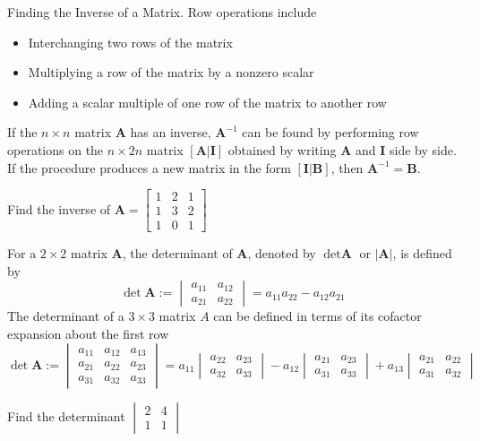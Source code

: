 \documentclass[../diffeq.tex]{subfiles}
\begin{document}
Finding the Inverse of a Matrix. Row operations include 
\begin{itemize}
    \item Interchanging two rows of the matrix 
    \item Multiplying a row of the matrix by a nonzero scalar
    \item Adding a scalar multiple of one row of the matrix to another row 
\end{itemize}
If the $n\times n$ matrix $\textbf{A}$ has an inverse, $\textbf{A}^{-1}$ can be found by performing row operations on the $n\times 2n$ matrix $[\textbf{A}|\textbf{I}]$ obtained by writing 
$\textbf{A}$ and $\textbf{I}$ side by side. If the procedure produces a new matrix in the form $[\textbf{I}|\textbf{B}]$, then $\textbf{A}^{-1}=\textbf{B}$.

\ex Find the inverse of $\textbf{A}=\begin{bmatrix}
    1&2&1\\1&3&2\\1&0&1
\end{bmatrix}$

For a $2\times 2$ matrix $\textbf{A}$, the determinant of $\textbf{A}$, denoted by $\det \textbf{A}$ or $|\textbf{A}|$, is defined by 
\[ \det \textbf{A} := \begin{vmatrix}
    a_{11} & a_{12}\\
    a_{21} & a_{22}
\end{vmatrix} = a_{11}a_{22}-a_{12}a_21\]
The determinant of a $3\times 3$ matrix $A$ can be defined in terms of its cofactor expansion about the first row 
\[ \det \textbf{A} := \begin{vmatrix}
    a_{11} & a_{12} & a_{13}\\
    a_{21} & a_{22} & a_{23}\\
    a_{31} & a_{32} & a_{33}
\end{vmatrix}=a_{11}\begin{vmatrix}
    a_{22} & a_{23}\\
    a_{32} & a_{33}
\end{vmatrix}-a_{12}\begin{vmatrix}
    a_{21} & a_{23}\\
    a_{31} & a_{33}
\end{vmatrix}+a_{13}\begin{vmatrix}
    a_{21} & a_{22}\\
    a_{31} & a_{32}
\end{vmatrix} \]

\ex Find the determinant $\begin{vmatrix}
    2 & 4\\
    1&1
\end{vmatrix}$
\end{document}
